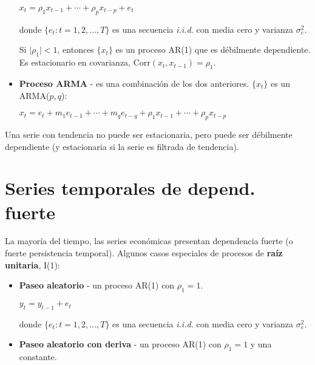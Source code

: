 \documentclass[10pt, a4paper, landscape]{article}
\newcommand{\Corr}{\mathrm{Corr}}
\begin{document}
\begin{multicols}{3}
\begin{itemize}[leftmargin=*]
			\begin{center}
				$x_{t} = \rho_{1} x_{t - 1} + \cdots + \rho_{p} x_{t - p}+ e_{t}$
			\end{center}
			
			donde $\lbrace e_{t}: t = 1, 2, \ldots, T \rbrace$ es una secuencia \textsl{i.i.d.} con media cero y varianza $\sigma^{2}_{e}$.
			
			Si $\lvert \rho_{1} \rvert < 1$, entonces $\lbrace x_{t} \rbrace$ es un proceso AR(1) que es débilmente dependiente. Es estacionario en covarianza, $\Corr(x_{t}, x_{t - 1}) = \rho_{1}$.
		
		\columnbreak
		
			\item \textbf{Proceso ARMA} - es una combinación de los dos anteriores. $\lbrace x_{t} \rbrace$ es un ARMA($p, q$):
			
			\begin{center}
				$x_{t} = e_{t} + m_{1} e_{t - 1} + \cdots + m_{q} e_{t - q} + \rho_{1} x_{t - 1} + \cdots + \rho_{p} x_{t - p}$
			\end{center}
		\end{itemize}
		
		Una serie con tendencia no puede ser estacionaria, pero puede ser débilmente dependiente (y estacionaria si la serie es filtrada de tendencia).
		
		\section*{Series temporales de depend. fuerte}
		
		La mayoría del tiempo, las series económicas presentan dependencia fuerte (o fuerte persistencia temporal). Algunos casos especiales de procesos de \textbf{raíz unitaria}, I(1):
		
		\begin{itemize}[leftmargin=*]
			\item \textbf{Paseo aleatorio} - un proceso AR(1) con $\rho_{1} = 1$.
			
			\begin{center}
				$y_{t} = y_{t - 1} + e_{t}$
			\end{center}
			
			donde $\lbrace e_{t} : t = 1, 2, \ldots, T \rbrace$ es una secuencia \textsl{i.i.d.} con media cero y varianza $\sigma^{2}_{e}$.
			
			\item \textbf{Paseo aleatorio con deriva} - un proceso AR(1) con $\rho_{1} = 1$ y una constante.
			

\end{itemize}
\end{multicols}
\end{document}
